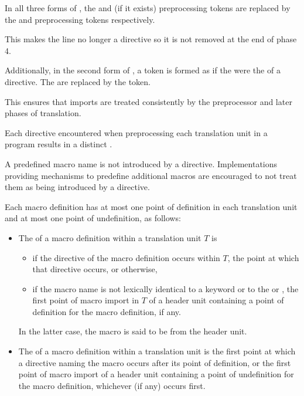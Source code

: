 \pnum
In all three forms of ,
the  and  (if it exists) preprocessing tokens
are replaced by the  and
 preprocessing tokens respectively.
\begin{note}
This makes the line no longer a directive
so it is not removed at the end of phase 4.
\end{note}
Additionally, in the second form of ,
a  token is formed as if
the 
were the  of a  directive.
The  are replaced by
the  token.
\begin{note}
This ensures that imports are treated consistently by
the preprocessor and later phases of translation.
\end{note}

\pnum
Each  directive encountered when preprocessing
each translation unit in a program results in a distinct
.
\begin{note}
A predefined macro name
is not introduced by a  directive.
Implementations providing mechanisms to predefine additional macros
are encouraged to not treat them
as being introduced by a  directive.
\end{note}
Each macro definition has at most one point of definition in
each translation unit and at most one point of undefinition, as follows:
\begin{itemize}
\item
{}%
The 
of a macro definition within a translation unit $T$ is
\begin{itemize}
\item
if the  directive of the macro definition occurs within $T$,
the point at which that directive occurs, or otherwise,
\item
if the macro name is not lexically identical to a keyword
or to the   or ,
the first point of macro import in $T$ of a header unit
containing a point of definition for the macro definition, if any.
\end{itemize}
In the latter case, the macro is said
to be  from the header unit.

\item
{}%
The 
of a macro definition within a translation unit
is the first point at which a  directive naming the macro occurs
after its point of definition, or the first point
of macro import of a header unit containing a point of undefinition for the
macro definition, whichever (if any) occurs first.
\end{itemize}

